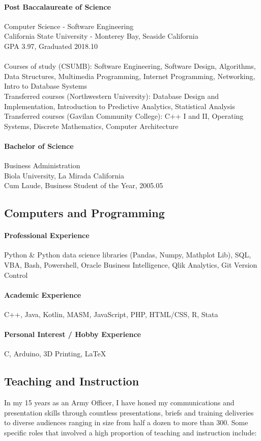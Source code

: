 \documentclass[12pt,letterpaper]{article}
\begin{document}
\paragraph{Post Baccalaureate of Science} Computer Science - Software Engineering\\
California State University - Monterey Bay, Seaside California\\
GPA 3.97, Graduated 2018.10\\
 \\
Courses of study (CSUMB): Software Engineering, Software Design, Algorithms, Data Structures, Multimedia Programming, Internet Programming, Networking, Intro to Database Systems\\
Transferred courses (Northwestern University): Database Design and Implementation, Introduction to Predictive Analytics, Statistical Analysis\\
Transferred courses (Gavilan Community College): C++ I and II, Operating Systems, Discrete Mathematics, Computer Architecture

\paragraph{Bachelor of Science}
Business Administration\\
Biola University, La Mirada California\\
Cum Laude, Business Student of the Year, 2005.05

\subsection{Computers and Programming}
\paragraph{Professional Experience} Python \& Python data science libraries (Pandas, Numpy, Mathplot Lib), SQL, VBA, Bash, Powershell, Oracle Business Intelligence, Qlik Analytics, Git Version Control
\paragraph{Academic Experience} C++, Java, Kotlin, MASM, JavaScript, PHP, HTML/CSS, R, Stata
\paragraph{Personal Interest / Hobby Experience} C, Arduino, 3D Printing, LaTeX
\subsection{Teaching and Instruction}
In my 15 years as an Army Officer, I have honed my communications and presentation skills through countless presentations, briefs and training deliveries to diverse audiences ranging in size from half a dozen to more than 300. Some specific roles that involved a high proportion of teaching and instruction include:
\end{document}
